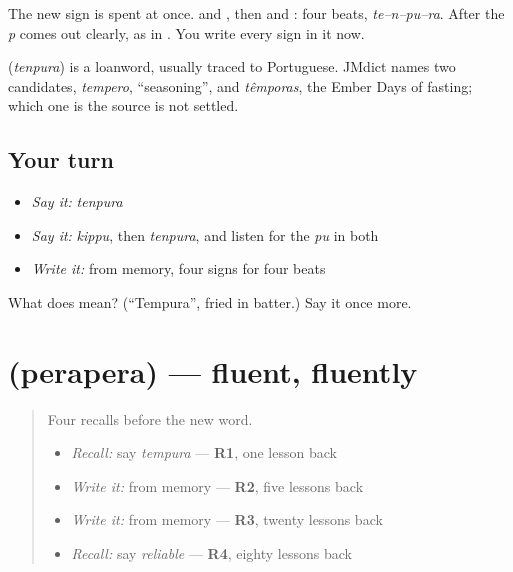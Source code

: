 The new sign is spent at once. \textbf{} and \textbf{}, then \textbf{} and \textbf{}: four beats, \emph{te–n–pu–ra}. After \textbf{} the \emph{p} comes out clearly, as in \textbf{}. You write every sign in it now.

\begin{cousinweb}
\textbf{} (\emph{tenpura}) is a loanword, usually traced to Portuguese. JMdict names two candidates, \emph{tempero}, \textquotedblleft{}seasoning\textquotedblright{}, and \emph{têmporas}, the Ember Days of fasting; which one is the source is not settled.
\end{cousinweb}

\subsection*{Your turn}
\begin{itemize}
\raggedright
  \item \emph{Say it:} \emph{tenpura}
  \item \emph{Say it:} \emph{kippu}, then \emph{tenpura}, and listen for the \emph{pu} in both
  \item \emph{Write it:} \textbf{} from memory, four signs for four beats
\end{itemize}

\begin{tcolorbox}[breakable,colback=teal!4,colframe=teal!35!black,title={Before you move on}]
What does  mean? (\textquotedblleft{}Tempura\textquotedblright{}, fried in batter.) Say it once more.
\end{tcolorbox}
\section[\texorpdfstring{\ja{ぺらぺら} (perapera)}{ぺらぺら (perapera)}]{ (perapera) — fluent, fluently}

\label{lesson:JA-C137-perapera}



\begin{quote}
Four recalls before the new word.

\begin{itemize}
\raggedright
  \item \emph{Recall:} say \emph{tempura} — \textbf{R1}, one lesson back
  \item \emph{Write it:} \textbf{} from memory — \textbf{R2}, five lessons back
  \item \emph{Write it:} \textbf{} from memory — \textbf{R3}, twenty lessons back
  \item \emph{Recall:} say \emph{reliable} — \textbf{R4}, eighty lessons back
\end{itemize}
\end{quote}

